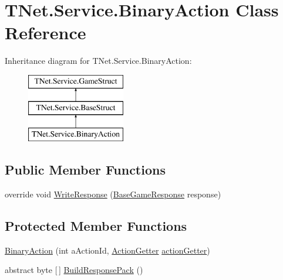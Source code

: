 \hypertarget{class_t_net_1_1_service_1_1_binary_action}{}\section{T\+Net.\+Service.\+Binary\+Action Class Reference}
\label{class_t_net_1_1_service_1_1_binary_action}


 


Inheritance diagram for T\+Net.\+Service.\+Binary\+Action\+:\begin{figure}[H]
\begin{center}
\leavevmode
\includegraphics[height=3.000000cm]{class_t_net_1_1_service_1_1_binary_action}
\end{center}
\end{figure}
\subsection*{Public Member Functions}
\begin{DoxyCompactItemize}
\item 
override void \mbox{\hyperlink{class_t_net_1_1_service_1_1_binary_action_aafac48c10d3e9601ff6a8a77555fc400}{Write\+Response}} (\mbox{\hyperlink{class_t_net_1_1_service_1_1_base_game_response}{Base\+Game\+Response}} response)
\end{DoxyCompactItemize}
\subsection*{Protected Member Functions}
\begin{DoxyCompactItemize}
\item 
\mbox{\hyperlink{class_t_net_1_1_service_1_1_binary_action_adf1a6321981e4945d5c83300b67f8949}{Binary\+Action}} (int a\+Action\+Id, \mbox{\hyperlink{class_t_net_1_1_service_1_1_action_getter}{Action\+Getter}} \mbox{\hyperlink{class_t_net_1_1_service_1_1_game_struct_a14dcf224eb5a73e2c0b3bee4fe359dd8}{action\+Getter}})
\item 
abstract byte \mbox{[}$\,$\mbox{]} \mbox{\hyperlink{class_t_net_1_1_service_1_1_binary_action_a89ee793001723046ef14ca717dc8479d}{Build\+Response\+Pack}} ()
\end{DoxyCompactItemize}
